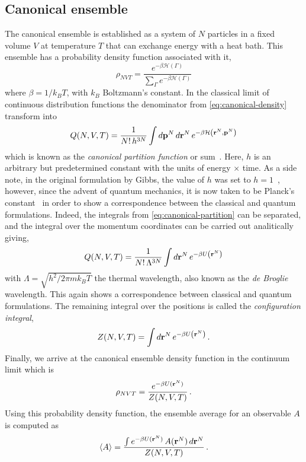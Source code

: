\subsection{Canonical ensemble}
The canonical ensemble is established as a system of $N$ particles in a fixed volume $V$
at temperature $T$ that can exchange energy with a heat bath. This ensemble has a
probability density function associated with it,
\begin{equation}
    \rho_{NVT} = \frac{e^{-\beta \mathcal{H}(\Gamma)}}{\sum_{\Gamma} e^{-\beta \mathcal{H}(\Gamma)}}
    \label{eq:canonical-density}
\end{equation}
where $\beta=1/k_{B} T$, with $k_{B}$ Boltzmann's constant. In the classical limit of
continuous distribution functions the denominator from \autoref{eq:canonical-density}
transform into
\begin{equation}
    Q(N,V,T) = \frac{1}{N! \, h^{3N}} \int d \mathbf{p}^{N} \, d \mathbf{r}^{N} \,
    e^{- \beta \mathcal{H} \left( \mathbf{r}^N, \mathbf{p}^N \right)}
    \label{eq:canonical-partition}
\end{equation}
which is known as the \emph{canonical partition function} or sum~\cite{huangStatisticalMechanics1987}.
Here, $h$ is an arbitrary but predetermined constant with the units of energy $\times$
time. As a side note, in the original formulation by Gibbs, the value of $h$ was set
to $h=1$~\cite{gibbsElementaryPrinciplesStatistical2014}, however, since the advent
of quantum mechanics, it is now taken to be Planck's constant~\cite{tolmanPrinciplesStatisticalMechanics1979}
in order to show a correspondence between the classical and quantum formulations.
Indeed, the integrals from \autoref{eq:canonical-partition} can be separated, and the
integral over the momentum coordinates can be carried out analitically giving,
\begin{equation}
    Q(N,V,T) = \frac{1}{N! \, \Lambda^{3N}} \int d \mathbf{r}^{N} \,
    e^{- \beta U \left( \mathbf{r}^N \right)}
    \label{eq:canonical-partition-position}
\end{equation}
with $\Lambda=\sqrt{h^2 / 2 \pi m k_{B} T}$ the thermal wavelength, also known as the
\emph{de Broglie} wavelength. This again shows a correspondence between classical
and quantum formulations. The remaining integral over the positions is called the
\emph{configuration integral},
\begin{equation}
    Z(N,V,T) = \int d \mathbf{r}^{N} \, e^{- \beta U \left( \mathbf{r}^N \right)} \, .
    \label{eq:configuration-int}
\end{equation}
Finally, we arrive at the canonical ensemble density function in the continuum limit
which is
\begin{equation}
    \rho_{NVT} = \frac{e^{- \beta U(\mathbf{r}^{N})}}{Z(N,V,T)} \, .
    \label{eq:canonical-limit}
\end{equation}
Using this probability density function, the ensemble average for an observable $A$ is
computed as
\begin{equation}
    \left< A \right> = \frac{\int e^{- \beta U(\mathbf{r}^{N})} \, A(\mathbf{r}^{N}) \, d \mathbf{r}^{N}}{Z(N,V,T)} \, .
    \label{eq:average-canonical}
\end{equation}


